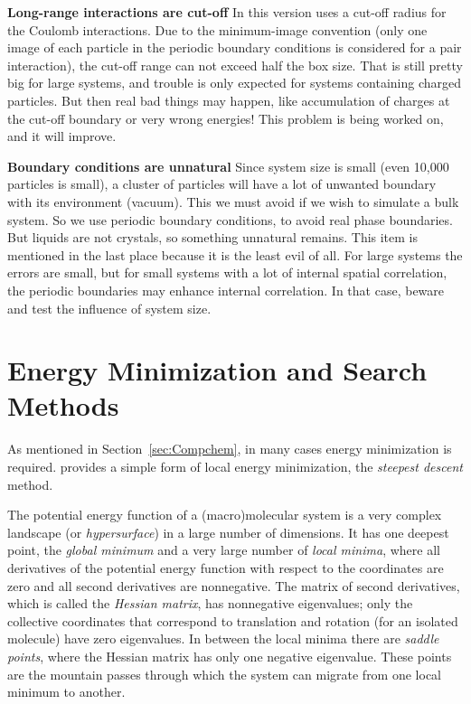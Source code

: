 {\bf Long-range interactions are cut-off}
In this version {\gromacs} uses a cut-off radius for the Coulomb
interactions. Due to the minimum-image convention (only one image of
each particle in the periodic boundary conditions is considered for a
pair interaction), the cut-off range can not exceed half the box
size. That is still pretty big for large systems, and trouble is only
expected for systems containing charged particles. But then real bad
things may happen, like accumulation of charges at the cut-off
boundary or very wrong energies! This problem is being worked on, and
it will improve. 

{\bf Boundary conditions are unnatural}
Since system size is small (even 10,000 particles is small), a cluster
of particles will have a lot of unwanted boundary with its environment
(vacuum). This we must avoid if we wish to simulate a bulk system. So
we use periodic boundary conditions, to avoid real phase
boundaries. But liquids are not crystals, so something unnatural
remains. This item is mentioned in the last place because it is the
least evil of all. For large systems the errors are small, but for
small systems with a lot of internal spatial correlation, the periodic
boundaries may enhance internal correlation. In that case, beware and
test the influence of system size.  

\section{Energy Minimization and Search Methods}

As mentioned in Section~\ref{sec:Compchem}, in many cases energy
minimization is required. {\gromacs} provides a simple form of local
energy minimization, the {\em steepest descent} method. 

The potential energy function of a (macro)molecular system is a very
complex landscape (or {\em hypersurface}) in a large number of
dimensions. It has one deepest point, the {\em global minimum} and a
very large number of {\em local minima}, where all derivatives of the
potential energy function with respect to the coordinates are zero and
all second derivatives are nonnegative. The matrix of second
derivatives, which is called the {\em Hessian matrix}, has nonnegative
eigenvalues; only the collective coordinates that correspond to
translation and rotation (for an isolated molecule) have zero
eigenvalues. In between the local minima there are {\em saddle
points}, where the Hessian matrix has only one negative
eigenvalue. These points are the mountain passes through which the
system can migrate from one local minimum to another.  

